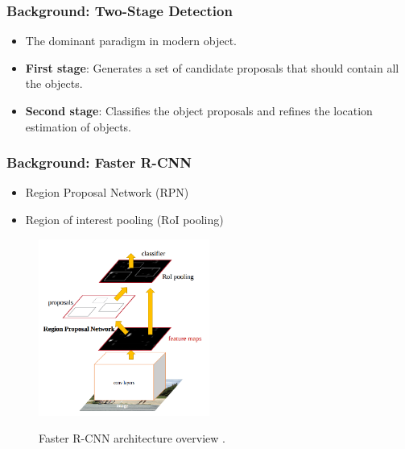 \documentclass[10pt,fleqn,unknownkeysallowed]{beamer}
\begin{document}
\begin{frame}
	\frametitle{Background: Two-Stage Detection}
	\linespread{1.5}
	\begin{itemize}
		\item{The dominant paradigm in modern object.}
		\item{\textbf{First stage}: Generates
			a set of candidate proposals that should contain all the objects.}
		\item{\textbf{Second stage}: Classifies the object proposals and refines the location estimation of objects.}
	\end{itemize}
\end{frame}

\begin{frame}
	\frametitle{Background: Faster R-CNN}
	\begin{itemize}
		\item{Region Proposal Network (RPN)}
		\item{Region of interest pooling (RoI pooling)}
	\end{itemize}
	\begin{figure}
		\begin{center}
			\includegraphics[width=0.5\textwidth]{images/faster_rcnn} \\
			\caption{Faster R-CNN architecture overview \cite{faster_rcnn}.}
		\end{center}
	\end{figure}
\end{frame}
\end{document}
